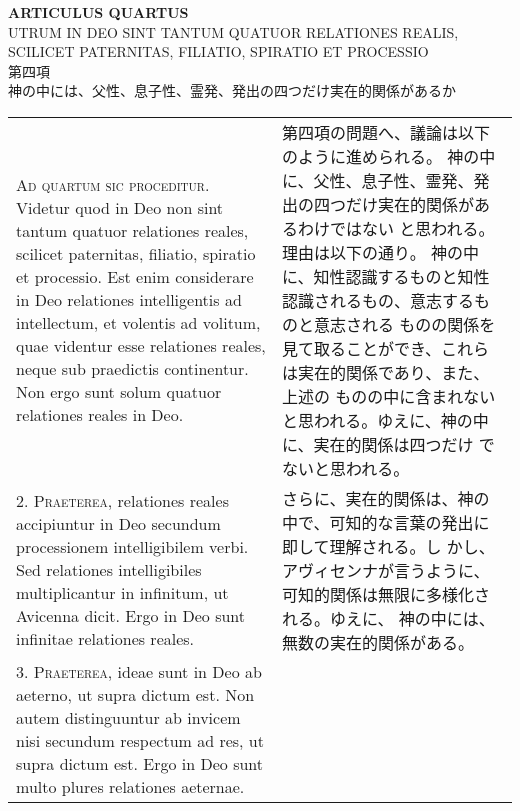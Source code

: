 \documentclass[10pt]{jsarticle} %
\begin{document}
\newpage



\begin{center}
 {\Large {\bf ARTICULUS QUARTUS}}\\
 {\large UTRUM IN DEO SINT TANTUM QUATUOR RELATIONES REALIS,\\SCILICET
 PATERNITAS, FILIATIO, SPIRATIO ET PROCESSIO}\\
 {\Large 第四項\\神の中には、父性、息子性、霊発、発出の四つだけ実在的関係があるか}
\end{center}

\begin{longtable}{p{21em}p{21em}}



{\Huge A}{\scshape d quartum sic proceditur}. Videtur quod in Deo non sint tantum quatuor
relationes reales, scilicet paternitas, filiatio, spiratio et
processio. Est enim considerare in Deo relationes intelligentis ad
intellectum, et volentis ad volitum, quae videntur esse relationes
reales, neque sub praedictis continentur. Non ergo sunt solum quatuor
relationes reales in Deo.


&


第四項の問題へ、議論は以下のように進められる。
神の中に、父性、息子性、霊発、発出の四つだけ実在的関係があるわけではない
 と思われる。理由は以下の通り。
神の中に、知性認識するものと知性認識されるもの、意志するものと意志される
 ものの関係を見て取ることができ、これらは実在的関係であり、また、上述の
 ものの中に含まれないと思われる。ゆえに、神の中に、実在的関係は四つだけ
 でないと思われる。

\\



2. {\scshape Praeterea}, relationes reales accipiuntur in Deo secundum processionem
intelligibilem verbi. Sed relationes intelligibiles multiplicantur in
infinitum, ut Avicenna dicit. Ergo in Deo sunt infinitae relationes
reales.


&


さらに、実在的関係は、神の中で、可知的な言葉の発出に即して理解される。し
 かし、アヴィセンナが言うように、可知的関係は無限に多様化される。ゆえに、
 神の中には、無数の実在的関係がある。

\\



3. {\scshape Praeterea}, ideae sunt in Deo ab aeterno, ut supra dictum est. Non autem
distinguuntur ab invicem nisi secundum respectum ad res, ut supra dictum
est. Ergo in Deo sunt multo plures relationes aeternae.



\end{longtable}
\end{document}
